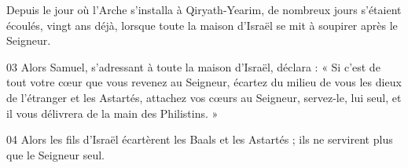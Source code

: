 Depuis le jour où l’Arche s’installa à Qiryath-Yearim, de nombreux jours s’étaient écoulés, vingt ans déjà, lorsque toute la maison d’Israël se mit à soupirer après le Seigneur.

03 Alors Samuel, s’adressant à toute la maison d’Israël, déclara : « Si c’est de tout votre cœur que vous revenez au Seigneur, écartez du milieu de vous les dieux de l’étranger et les Astartés, attachez vos cœurs au Seigneur, servez-le, lui seul, et il vous délivrera de la main des Philistins. »

04 Alors les fils d’Israël écartèrent les Baals et les Astartés ; ils ne servirent plus que le Seigneur seul.
